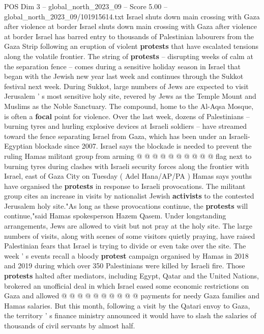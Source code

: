 \begin{textsample}{POS Dim 3 – global\_north\_2023\_09 – Score 5.00 – global\_north\_2023\_09/101915614.txt}  \label{ex:f3_pos_068}
Israel shuts down main crossing with Gaza after violence at border Israel shuts down main crossing with Gaza after violence at border Israel has barred entry to thousands of Palestinian labourers from the Gaza Strip following an eruption of violent \textbf{protests} that have escalated tensions along the volatile frontier.
The string of \textbf{protests} -- disrupting weeks of calm at the separation fence -- comes during a sensitive holiday season in Israel that began with the Jewish new year last week and continues through the Sukkot festival next week.
During Sukkot, large numbers of Jews are expected to visit Jerusalem ' s most sensitive holy site, revered by Jews as the Temple Mount and Muslims as the Noble Sanctuary.
The compound, home to the Al-Aqsa Mosque, is often a \textbf{focal} point for violence.
Over the last week, dozens of Palestinians -- burning tyres and hurling explosive devices at Israeli soldiers -- have streamed toward the fence separating Israel from Gaza, which has been under an Israeli-Egyptian blockade since 2007.
Israel says the blockade is needed to prevent the ruling Hamas militant group from arming @ @ @ @ @ @ @ @ @ @ flag next to burning tyres during clashes with Israeli security forces along the frontier with Israel, east of Gaza City on Tuesday ( Adel Hana/AP/PA ) Hamas says youths have organised the \textbf{protests} in response to Israeli provocations.
The militant group cites an increase in visits by nationalist Jewish \textbf{activists} to the contested Jerusalem holy site."As long as these provocations continue, the \textbf{protests} will continue,"said Hamas spokesperson Hazem Qasem.
Under longstanding arrangements, Jews are allowed to visit but not pray at the holy site.
The large numbers of visits, along with scenes of some visitors quietly praying, have raised Palestinian fears that Israel is trying to divide or even take over the site.
The week ' s events recall a bloody \textbf{protest} campaign organised by Hamas in 2018 and 2019 during which over 350 Palestinians were killed by Israeli fire.
Those \textbf{protests} halted after mediators, including Egypt, Qatar and the United Nations, brokered an unofficial deal in which Israel eased some economic restrictions on Gaza and allowed @ @ @ @ @ @ @ @ @ @ payments for needy Gaza families and Hamas salaries.
But this month, following a visit by the Qatari envoy to Gaza, the territory ' s finance ministry announced it would have to slash the salaries of thousands of civil servants by almost half.

\end{textsample}

